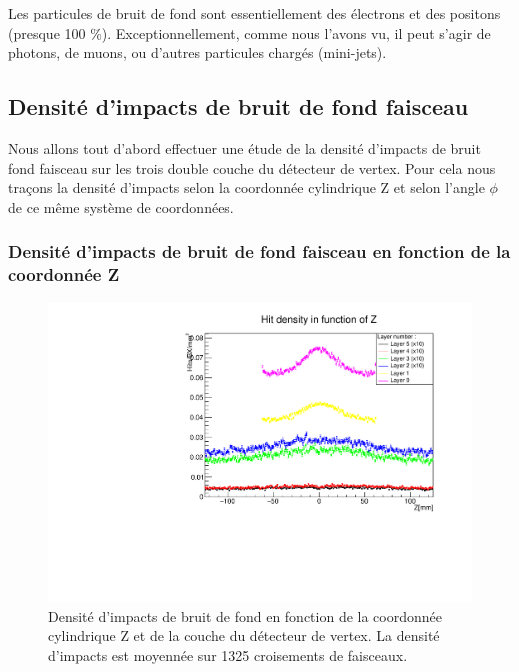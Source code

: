   \medskip

  Les particules de bruit de fond sont essentiellement des \'electrons et des positons (presque 100 \%). Exceptionnellement, comme nous l'avons vu, il peut s'agir de photons, de muons, ou d'autres particules charg\'es (mini-jets).

  \subsection{Densit\'e d'impacts de bruit de fond faisceau}

  Nous allons tout d'abord effectuer une \'etude de la densit\'e d'impacts de bruit fond faisceau sur les trois double couche du d\'etecteur de vertex. Pour cela nous tra\c{c}ons la densit\'e d'impacts selon la coordonn\'ee cylindrique Z et selon l'angle $\phi$ de ce m\^eme syst\`eme de coordonn\'ees.

  \subsubsection{Densit\'e d'impacts de bruit de fond faisceau en fonction de la coordonn\'ee Z}

  \begin{figure}[!htb]
    \begin{center}
      \includegraphics[scale=0.60]{./figures/Beamstrahlung/hitDensities_vs_Z_AllLayers.pdf}
      \caption{Densit\'e d'impacts de bruit de fond en fonction de la coordonn\'ee cylindrique Z et de la couche du d\'etecteur de vertex. La densit\'e d'impacts est moyenn\'ee sur 1325 croisements de faisceaux.}
      \label{fig:hitDensitiesVsZ_AllLayers}
    \end{center}
  \end{figure}
 
